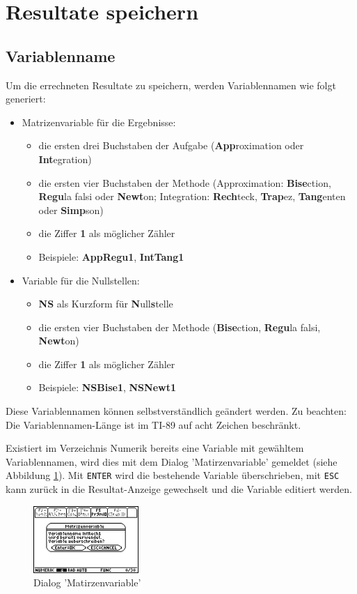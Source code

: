 \documentclass[
	a4paper							%
	,12pt							%
	,twoside						%
	,openright						%
]{scrreprt}							%
\begin{document}
\section{Resultate speichern}
\subsection{Variablenname}
Um die errechneten Resultate zu speichern, werden Variablennamen wie folgt generiert:
\begin{itemize}
    \item Matrizenvariable f\"ur die Ergebnisse:
    \begin{itemize}
      \item die ersten drei Buchstaben der Aufgabe (\textbf{App}roximation oder \textbf{Int}egration)
      \item die ersten vier Buchstaben der Methode (Approximation: \textbf{Bise}ction, \textbf{Regu}la falsi oder \textbf{Newt}on; Integration: \textbf{Rech}teck, \textbf{Trap}ez, \textbf{Tang}enten oder \textbf{Simp}son)
      \item die Ziffer \textbf{1} als m\"oglicher Z\"ahler
      \item Beispiele: \textbf{AppRegu1}, \textbf{IntTang1}
    \end{itemize}
    \item Variable f\"ur die Nullstellen:
    \begin{itemize}
      \item \textbf{NS} als Kurzform f\"ur \textbf{N}ull\textbf{s}telle
      \item die ersten vier Buchstaben der Methode (\textbf{Bise}ction, \textbf{Regu}la falsi, \textbf{Newt}on)
      \item die Ziffer \textbf{1} als m\"oglicher Z\"ahler
      \item Beispiele: \textbf{NSBise1}, \textbf{NSNewt1}
    \end{itemize}
\end{itemize}
Diese Variablennamen k\"onnen selbstverst\"andlich ge\"andert werden. Zu beachten: Die Variablennamen-L\"ange ist im TI-89 auf acht Zeichen beschr\"ankt.

Existiert im Verzeichnis Numerik bereits eine Variable mit gew\"ahltem Variablennamen, wird dies mit dem Dialog 'Matirzenvariable' gemeldet (siehe Abbildung \ref{fig:Matirzenvariable}). Mit \verb|ENTER| wird die bestehende Variable \"uberschrieben, mit \verb|ESC| kann zur\"uck in die Resultat-Anzeige gewechselt und die Variable editiert werden.
\begin{figure}[h]
  \centering
  \includegraphics[width=4cm]{img/nummeth_image032.png}
  \caption{Dialog 'Matirzenvariable'}
  \label{fig:Matirzenvariable}
\end{figure}
\end{document}
